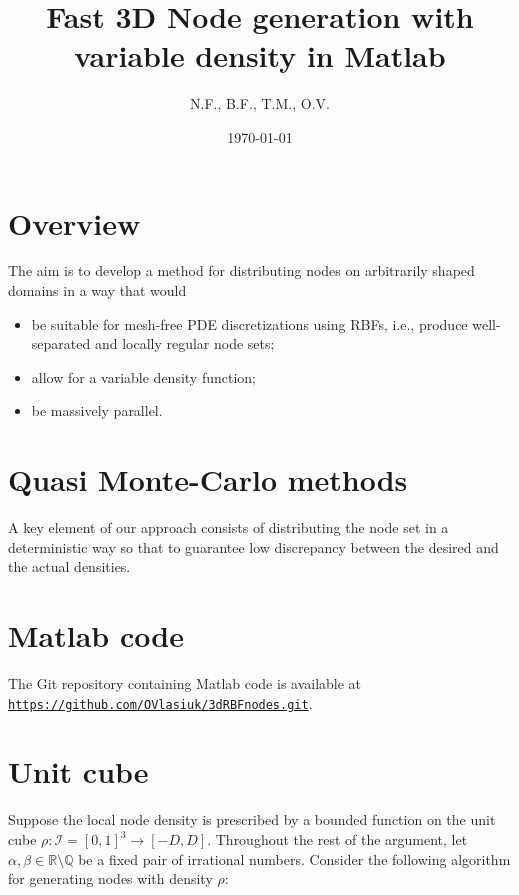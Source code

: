 \documentclass[10pt]{amsart}
\title{Fast 3D Node generation with variable density in Matlab}
\author{N.F., B.F., T.M., O.V.}
\date{\today}
\begin{document}
\maketitle

\section{Overview}

The aim is to develop a method for distributing nodes on arbitrarily shaped domains in a way that would 
\begin{itemize}
 \item be suitable for mesh-free PDE discretizations using RBFs, i.e., produce well-separated and locally regular node sets;
 \item allow for a variable density function;
 \item be massively parallel.
\end{itemize}

\section{Quasi Monte-Carlo methods}

A key element of our approach consists of distributing the node set in a deterministic way so that to guarantee low discrepancy between the desired and the actual densities.



\section{Matlab code}

The Git repository containing Matlab code is available at  \texttt{\url{https://github.com/OVlasiuk/3dRBFnodes.git}}.

\section{Unit cube}

Suppose the local node density is prescribed by a bounded function on the unit cube  $\rho: \mathcal{I} =[0,1]^3 \to [-D,D]$. Throughout the rest of the argument, let $ \alpha, \beta\in\mathbb{R}\setminus\mathbb{Q} $ be a fixed pair of irrational numbers. Consider the following algorithm for generating nodes with density $ \rho $:  
\end{document}
